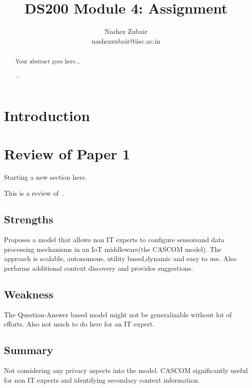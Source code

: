\documentclass[11pt,twocolumn,a4paper]{article}
\begin{document}
\title{DS200 Module 4: Assignment}

\author{Nashez Zubair\\ nashezzubair@iisc.ac.in}



\maketitle



\begin{abstract}

Your abstract goes here...

...

\end{abstract}



\section{Introduction}



\section{Review of Paper 1}

Starting a new section here.

This is a review of~\cite{perera:2016}.



\subsection{Strengths}
Proposes a model that allows non IT experts to configure sensorsand data processing mechanisms in an IoT middleware(the CASCOM model). The approach is scalable, autonomous, utility based,dynamic and easy to use. Also performs additional context discovery and provides suggestions.
\subsection{Weakness}
The Question-Answer based model might not be generalizable without lot of efforts. Also not much to do here for an IT expert.
\subsection{Summary}
Not considering any privacy aspects into the model. CASCOM significantly useful for non IT experts and identifying secondary context information.
\end{document}
